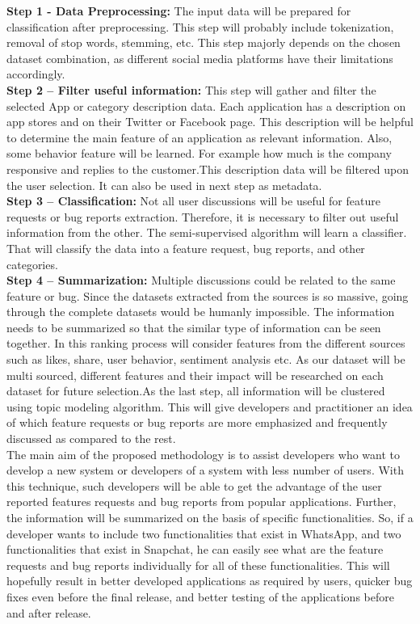 \textbf{Step 1 - Data Preprocessing: } The input data will be prepared for classification after preprocessing. This step will probably include tokenization, removal of stop words, stemming, etc. This step majorly depends on the chosen dataset combination, as different social media platforms have their limitations accordingly.\\

\textbf{Step 2 –  Filter useful information: } This step will gather and filter the selected App or category description data. Each application has a description on app stores and on their Twitter or Facebook page. This description will be helpful to determine the main feature of an application as relevant information. Also, some behavior feature will be learned.  For example how much is the company responsive and replies to the customer.This description data will be filtered upon the user selection. It can also be used in next step as metadata.\\

\textbf{Step 3 –  Classification: } Not all user discussions will be useful for feature requests or bug reports extraction. Therefore, it is necessary to filter out useful information from the other. The semi-supervised algorithm will learn a classifier. That will classify the data into a feature request, bug reports, and other categories.\\

\textbf{Step 4 – Summarization: } Multiple discussions could be related to the same feature or bug.
Since the datasets extracted from the sources is so massive, going through the complete datasets
would be humanly impossible. The information needs to be summarized so that the similar type
of information can be seen together. In this ranking process will consider features from the different sources such as likes, share, user behavior, sentiment analysis etc. As our dataset will be multi sourced, different features and their impact will be researched on each dataset for future selection.As the last step, all information will be clustered using topic modeling algorithm. This will
give developers and practitioner an idea of which feature requests or bug reports are more emphasized and frequently discussed as compared to the rest.\\

	The main aim of the proposed methodology is to assist developers who want to develop a new
system or developers of a system with less number of users. With this technique, such
developers will be able to get the advantage of the user reported features requests and bug reports
from popular applications. Further, the information will be summarized on the basis of specific
functionalities. So, if a developer wants to include two functionalities that exist in WhatsApp,
and two functionalities that exist in Snapchat, he can easily see what are the feature requests
and bug reports individually for all of these functionalities. This will hopefully result in better
developed applications as required by users, quicker bug fixes even before the final release, and
better testing of the applications before and after release.

